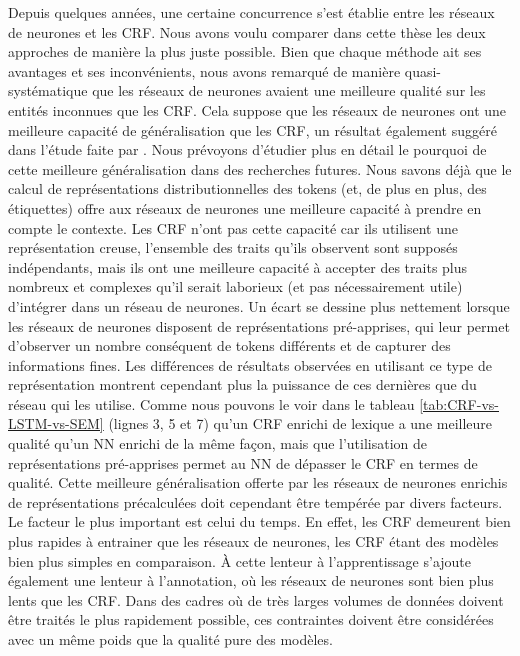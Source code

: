 \documentclass[PhD-Yoann-Dupont.tex]{subfiles}
\begin{document}
Depuis quelques années, une certaine concurrence s'est établie entre les réseaux de neurones et les CRF. Nous avons voulu comparer dans cette thèse les deux approches de manière la plus juste possible. Bien que chaque méthode ait ses avantages et ses inconvénients, nous avons remarqué de manière quasi-systématique que les réseaux de neurones avaient une meilleure qualité sur les entités inconnues que les CRF. Cela suppose que les réseaux de neurones ont une meilleure capacité de généralisation que les CRF, un résultat également suggéré dans l'étude faite par \citet{augenstein2017generalisation}. Nous prévoyons d'étudier plus en détail le pourquoi de cette meilleure généralisation dans des recherches futures. Nous savons déjà que le calcul de représentations distributionnelles des tokens (et, de plus en plus, des étiquettes) offre aux réseaux de neurones une meilleure capacité à prendre en compte le contexte. Les CRF n'ont pas cette capacité car ils utilisent une représentation creuse, l'ensemble des traits qu'ils observent sont supposés indépendants, mais ils ont une meilleure capacité à accepter des traits plus nombreux et complexes qu'il serait laborieux (et pas nécessairement utile) d'intégrer dans un réseau de neurones. Un écart se dessine plus nettement lorsque les réseaux de neurones disposent de représentations pré-apprises, qui leur permet d'observer un nombre conséquent de tokens différents et de capturer des informations fines. Les différences de résultats observées en utilisant ce type de représentation montrent cependant plus la puissance de ces dernières que du réseau qui les utilise. Comme nous pouvons le voir dans le tableau \ref{tab:CRF-vs-LSTM-vs-SEM} (lignes 3, 5 et 7) qu'un CRF enrichi de lexique a une meilleure qualité qu'un NN enrichi de la même façon, mais que l'utilisation de représentations pré-apprises permet au NN de dépasser le CRF en termes de qualité. Cette meilleure généralisation offerte par les réseaux de neurones enrichis de représentations précalculées doit cependant être tempérée par divers facteurs. Le facteur le plus important est celui du temps. En effet, les CRF demeurent bien plus rapides à entrainer que les réseaux de neurones, les CRF étant des modèles bien plus simples en comparaison. À cette lenteur à l'apprentissage s'ajoute également une lenteur à l'annotation, où les réseaux de neurones sont bien plus lents que les CRF. Dans des cadres où de très larges volumes de données doivent être traités le plus rapidement possible, ces contraintes doivent être considérées avec un même poids que la qualité pure des modèles.
\end{document}
